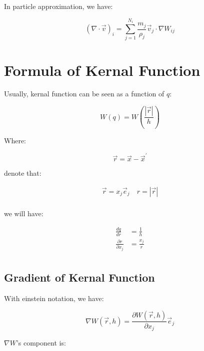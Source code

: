 \documentclass[10pt, oneside]{article}
\begin{document}
In particle approximation, we have:

\begin{equation}
    (\nabla \cdot \vec{v})_i = \sum_{j=1}^{N_i} \frac{m_j}{\rho_j} \vec{v}_j \cdot \nabla W_{ij}
\end{equation}

\section{Formula of Kernal Function}

Usually, kernal function can be seen as a function of $q$:

\begin{equation}
    W(q) = W\left(\frac{|\vec{r}|}{h}\right)
\end{equation}

Where:

\begin{equation}
    \vec{r} = \vec{x} - \vec{x}^\prime
\end{equation}

denote that:

\begin{equation}
    \begin{aligned}
        \vec{r} = x_j \vec{e}_j \quad r = |\vec{r}|\\
    \end{aligned}
\end{equation}

we will have:

\begin{equation}
    \begin{aligned}
        \frac{dq}{dr} &= \frac{1}{h}\\
        \frac{\partial r}{\partial x_j} &= \frac{x_j}{r}\\
    \end{aligned}
\end{equation}

\subsection{Gradient of Kernal Function}

With einstein notation, we have:

\begin{equation}
    \nabla W(\vec{r}, h) = \frac{\partial W(\vec{r},h)}{\partial x_j}\vec{e}_j
\end{equation}

$\nabla W$'s component is:
\end{document}
